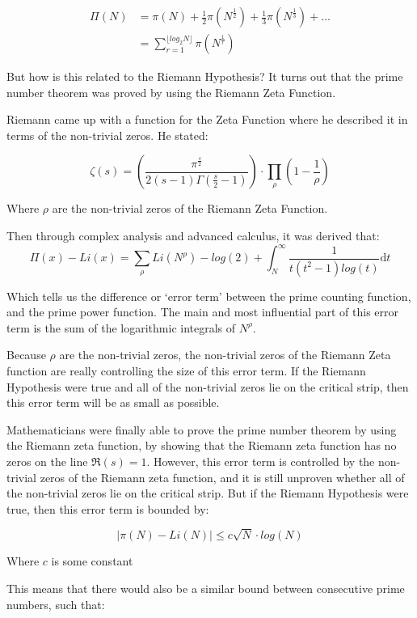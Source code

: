 \documentclass[12pt]{article}
\begin{document}
\begin{align*}
    \Pi(N) &= \pi(N) + \frac{1}{2}\pi(N^{\frac{1}{2}}) + \frac{1}{3}\pi(N^{\frac{1}{3}}) + \dots \\
           &= \sum_{r=1}^{\lfloor log_2  N\rfloor} \pi(N^{\frac{1}{r}})
\end{align*}

But how is this related to the Riemann Hypothesis? It turns out that the prime number theorem was proved by using the Riemann Zeta Function.

Riemann came up with a function for the Zeta Function where he described it in terms of the non-trivial zeros. He stated:

$$\zeta(s) = \left(\frac{\pi^{\frac{s}{2}}}{2\left(s-1\right)\Gamma\left(\frac{s}{2}-1\right)} \right ) \cdot \prod_{\rho}\left(1-\frac{1}{\rho}\right)$$

Where $\rho$ are the non-trivial zeros of the Riemann Zeta Function.

Then through complex analysis and advanced calculus, it was derived that:
$$\Pi(x) - Li(x) = \sum_{\rho}Li(N^\rho) - log(2) + \int_{N}^{\infty} \frac{1}{t(t^2-1)log(t)} \mathrm{d}t$$

Which tells us the difference or ‘error term’ between the prime counting function, and the prime power function. The main and most influential part of this error term is the sum of the logarithmic integrals of $N^\rho$.

Because $\rho$ are the non-trivial zeros, the non-trivial zeros of the Riemann Zeta function are really controlling the size of this error term. If the Riemann Hypothesis were true and all of the non-trivial zeros lie on the critical strip, then this error term will be as small as possible.

Mathematicians were finally able to prove the prime number theorem by using the Riemann zeta function, by showing that the Riemann zeta function has no zeros on the line $\Re(s) = 1$. However, this error term is controlled by the non-trivial zeros of the Riemann zeta function, and it is still unproven whether all of the non-trivial zeros lie on the critical strip. But if the Riemann Hypothesis were true, then this error term is bounded by:

$$|\pi(N) - Li(N)| \leq c \sqrt{N} \cdot log(N)$$

Where $c$ is some constant

This means that there would also be a similar bound between consecutive prime numbers, such that:
\end{document}
